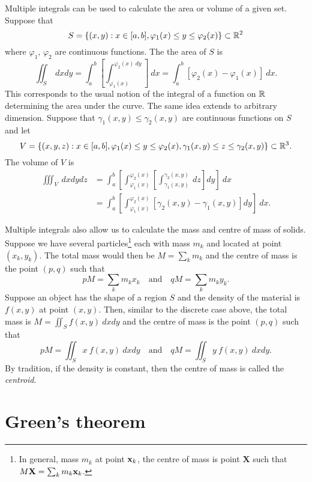 Multiple integrals can be used to calculate the area or volume of a given set.
Suppose that
\[
    S = \left\{(x,y): x \in [a,b], \varphi_1(x) \leq y \leq \varphi_2(x)\right\}  \subset \mathbb{R}^2
\]
where \(\varphi_1\), \(\varphi_2\) are continuous functions.
The the area of \(S\) is
\[
    \iint_{S} \ dx dy = \int_{a}^{b} \left[ \int_{\varphi_1(x)}^{\varphi_2(x)\ dy}\right] \ dx
    = \int_{a}^{b} [ \varphi_2(x) - \varphi_1(x) ] \ dx.
\]
This corresponds to the usual notion of the integral of a function on \(\mathbb{R}\) determining the area under the curve.
The same idea extends to arbitrary dimension.
Suppose that \(\gamma_1(x,y) \leq \gamma_2(x,y)\) are continuous functions on \(S\) and let
\[
    V = \left\{ (x,y,z) :  x \in [a,b], \varphi_1(x) \leq y \leq \varphi_2(x), \gamma_1(x,y) \leq z \leq \gamma_2(x,y)  \right\} \subset \mathbb{R}^3.
\]
The volume of \(V\) is
\[
    \begin{aligned}
        \iiint_{V} \ dx dy dz
         & =  \int_{a}^{b}
        \left[ \int_{\varphi_1(x)}^{\varphi_2(x)}  \left[ \int_{ \gamma_1(x,y)}^{ \gamma_2(x,y)} \ dz \right] dy \right] \ dx \\
         & =  \int_{a}^{b}
        \left[ \int_{\varphi_1(x)}^{\varphi_2(x)}   [  \gamma_2(x,y)  -   \gamma_1(x,y) ] dy \right] \ dx.
    \end{aligned}
\]


Multiple integrals also allow us to calculate the mass and centre of mass of solids.
Suppose we have several particles\footnote{In general, mass \(m_k\) at point \(\mathbf{x}_k\), the centre of mass is point \(\mathbf{X}\) such that \( M\mathbf{X} = \sum_{k} m_k \mathbf{x}_k\).} each with mass \(m_k\) and located at point \((x_k,y_k)\).
The total mass would then be \(M = \sum_{k} m_k\)
and the centre of mass is the point \((p,q)\) such that
\[
    p M = \sum_{k} m_k x_k
    \quad \text{and} \quad
    q M = \sum_{k} m_k y_k.
\]
Suppose an object has the shape of a region \(S\) and the density of the material is \(f(x,y)\) at point \((x,y)\).
Then, similar to the discrete case above,
the total mass is \(M = \iint_{S} f(x,y) \ dx dy\)
and the centre of mass is the point \((p,q)\) such that
\[
    p M = \iint_{S} x \ f(x,y) \ dx dy
    \quad \text{and} \quad
    q M = \iint_{S} y \ f(x,y) \ dx dy.
\]
By tradition, if the density is constant, then the centre of mass is called the \emph{centroid}.


\section{Green's theorem}

